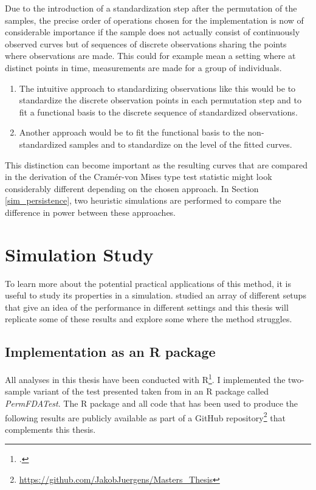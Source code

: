 \documentclass[12pt, a4paper]{article}
\theoremstyle{MAstyle} \newtheorem{assumption}{Assumption}[section]
\theoremstyle{MAstyle} \newtheorem{definition}{Definition}[section]
\theoremstyle{MAstyle} \newtheorem{theorem}{Theorem}[section]
\begin{document}
		Due to the introduction of a standardization step after the permutation of the samples, the precise order of operations chosen for the implementation is now of considerable importance if the sample does not actually consist of continuously observed curves but of sequences of discrete observations sharing the points where observations are made. This could for example mean a setting where at distinct points in time, measurements are made for a group of individuals.
		\begin{enumerate}
			\item The intuitive approach to standardizing observations like this would be to standardize the discrete observation points in each permutation step and to fit a functional basis to the discrete sequence of standardized observations.
			\item Another approach would be to fit the functional basis to the non-standardized samples and to standardize on the level of the fitted curves.
		\end{enumerate}
		This distinction can become important as the resulting curves that are compared in the derivation of the Cram\'{e}r-von Mises type test statistic might look considerably different depending on the chosen approach. In Section \ref{sim_persistence}, two heuristic simulations are performed to compare the difference in power between these approaches.

		
	\section{Simulation Study}\label{Simulation_Study}
		To learn more about the potential practical applications of this method, it is useful to study its properties in a simulation. \cite{bugni_permutation_2021} studied an array of different setups that give an idea of the performance in different settings and this thesis will replicate some of these results and explore some where the method struggles.
	
		\subsection{Implementation as an R package}
			All analyses in this thesis have been conducted with R\footcite{R}. I implemented the two-sample variant of the test presented taken from \cite{bugni_permutation_2021} in an R package called \textit{PermFDATest}. The R package and all code that has been used to produce the following results are publicly available as part of a GitHub repository\footnote{\href{https://github.com/JakobJuergens/Masters_Thesis}{https://github.com/JakobJuergens/Masters\_Thesis}} that complements this thesis.
			
\end{document}
